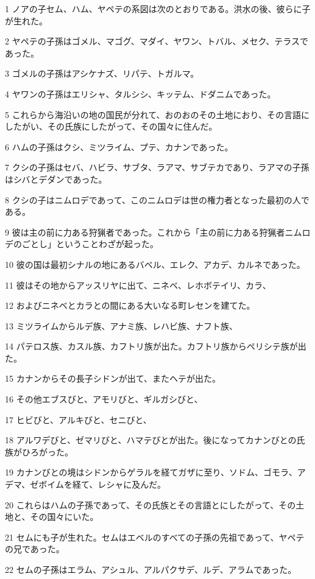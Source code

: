 \par 1 ノアの子セム、ハム、ヤペテの系図は次のとおりである。洪水の後、彼らに子が生れた。
\par 2 ヤペテの子孫はゴメル、マゴグ、マダイ、ヤワン、トバル、メセク、テラスであった。
\par 3 ゴメルの子孫はアシケナズ、リパテ、トガルマ。
\par 4 ヤワンの子孫はエリシャ、タルシシ、キッテム、ドダニムであった。
\par 5 これらから海沿いの地の国民が分れて、おのおのその土地におり、その言語にしたがい、その氏族にしたがって、その国々に住んだ。
\par 6 ハムの子孫はクシ、ミツライム、プテ、カナンであった。
\par 7 クシの子孫はセバ、ハビラ、サブタ、ラアマ、サブテカであり、ラアマの子孫はシバとデダンであった。
\par 8 クシの子はニムロデであって、このニムロデは世の権力者となった最初の人である。
\par 9 彼は主の前に力ある狩猟者であった。これから「主の前に力ある狩猟者ニムロデのごとし」ということわざが起った。
\par 10 彼の国は最初シナルの地にあるバベル、エレク、アカデ、カルネであった。
\par 11 彼はその地からアッスリヤに出て、ニネベ、レホボテイリ、カラ、
\par 12 およびニネベとカラとの間にある大いなる町レセンを建てた。
\par 13 ミツライムからルデ族、アナミ族、レハビ族、ナフト族、
\par 14 パテロス族、カスル族、カフトリ族が出た。カフトリ族からペリシテ族が出た。
\par 15 カナンからその長子シドンが出て、またヘテが出た。
\par 16 その他エブスびと、アモリびと、ギルガシびと、
\par 17 ヒビびと、アルキびと、セニびと、
\par 18 アルワデびと、ゼマリびと、ハマテびとが出た。後になってカナンびとの氏族がひろがった。
\par 19 カナンびとの境はシドンからゲラルを経てガザに至り、ソドム、ゴモラ、アデマ、ゼボイムを経て、レシャに及んだ。
\par 20 これらはハムの子孫であって、その氏族とその言語とにしたがって、その土地と、その国々にいた。
\par 21 セムにも子が生れた。セムはエベルのすべての子孫の先祖であって、ヤペテの兄であった。
\par 22 セムの子孫はエラム、アシュル、アルパクサデ、ルデ、アラムであった。

